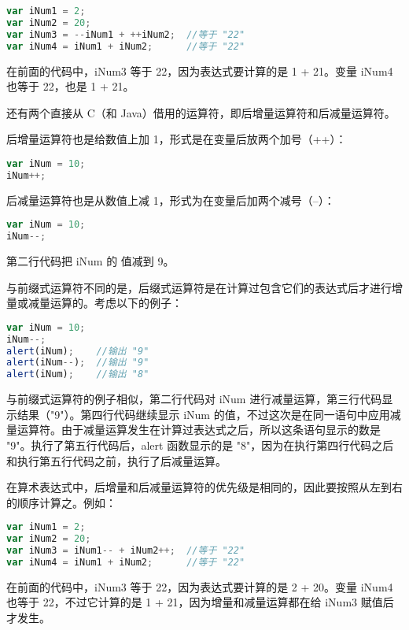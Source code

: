 \begin{lstlisting}[language=JavaScript]
var iNum1 = 2;
var iNum2 = 20;
var iNum3 = --iNum1 + ++iNum2;	//等于 "22"
var iNum4 = iNum1 + iNum2;		//等于 "22"
\end{lstlisting}

在前面的代码中，iNum3 等于 22，因为表达式要计算的是 1 + 21。变量 iNum4 也等于 22，也是 1 + 21。

还有两个直接从 C（和 Java）借用的运算符，即后增量运算符和后减量运算符。

后增量运算符也是给数值上加 1，形式是在变量后放两个加号（++）：

\begin{lstlisting}[language=JavaScript]
var iNum = 10;
iNum++;
\end{lstlisting}

后减量运算符也是从数值上减 1，形式为在变量后加两个减号（--）：


\begin{lstlisting}[language=JavaScript]
var iNum = 10;
iNum--;
\end{lstlisting}

第二行代码把 iNum 的 值减到 9。

与前缀式运算符不同的是，后缀式运算符是在计算过包含它们的表达式后才进行增量或减量运算的。考虑以下的例子：


\begin{lstlisting}[language=JavaScript]
var iNum = 10;
iNum--;
alert(iNum);	//输出 "9"
alert(iNum--);	//输出 "9"
alert(iNum);	//输出 "8"
\end{lstlisting}

与前缀式运算符的例子相似，第二行代码对 iNum 进行减量运算，第三行代码显示结果（"9"）。第四行代码继续显示 iNum 的值，不过这次是在同一语句中应用减量运算符。由于减量运算发生在计算过表达式之后，所以这条语句显示的数是 "9"。执行了第五行代码后，alert 函数显示的是 "8"，因为在执行第四行代码之后和执行第五行代码之前，执行了后减量运算。

在算术表达式中，后增量和后减量运算符的优先级是相同的，因此要按照从左到右的顺序计算之。例如：

\begin{lstlisting}[language=JavaScript]
var iNum1 = 2;
var iNum2 = 20;
var iNum3 = iNum1-- + iNum2++;	//等于 "22"
var iNum4 = iNum1 + iNum2;		//等于 "22"
\end{lstlisting}

在前面的代码中，iNum3 等于 22，因为表达式要计算的是 2 + 20。变量 iNum4 也等于 22，不过它计算的是 1 + 21，因为增量和减量运算都在给 iNum3 赋值后才发生。


